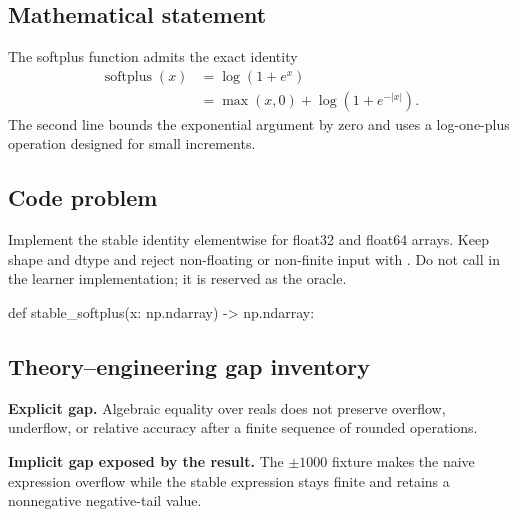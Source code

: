 
        \subsection{Mathematical statement}


The softplus function admits the exact identity
\[
\begin{aligned}
\operatorname{softplus}(x)
  &=\log(1+e^x)\\
  &=\max(x,0)+\log\!\left(1+e^{-|x|}\right).
\end{aligned}
\]
The second line bounds the exponential argument by zero and uses a log-one-plus
operation designed for small increments.


        \subsection{Code problem}


Implement the stable identity elementwise for float32 and float64 arrays.  Keep
shape and dtype and reject non-floating or non-finite input with
.\newline
Do not call  in the learner implementation; it is reserved as
the oracle.


        \begin{contractbox}
        \begin{Code}
        def stable_softplus(x: np.ndarray) -> np.ndarray:
        \end{Code}
        \end{contractbox}

        \subsection{Theory--engineering gap inventory}

        \begin{gapbox}
        \textbf{Explicit gap.} Algebraic equality over reals does not preserve overflow, underflow, or relative accuracy after a finite sequence of rounded operations.

        \textbf{Implicit gap exposed by the result.} The $\pm1000$ fixture makes the naive expression overflow while the stable expression stays finite and retains a nonnegative negative-tail value.
        \end{gapbox}

